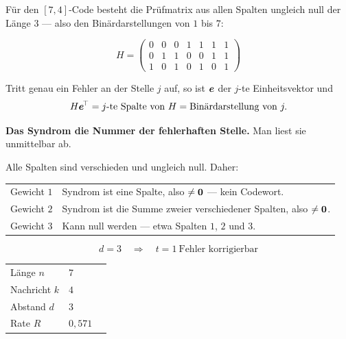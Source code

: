 \begin{merksatz}
Für den $[7,4]$-Code besteht die Prüfmatrix aus allen Spalten ungleich null der Länge $3$ --- also den Binärdarstellungen von $1$ bis $7$:

\[ H = \begin{pmatrix}
0&0&0&1&1&1&1\\
0&1&1&0&0&1&1\\
1&0&1&0&1&0&1
\end{pmatrix} \]

Tritt genau ein Fehler an der Stelle $j$ auf, so ist $\boldsymbol{e}$ der $j$-te Einheitsvektor und
\[ H\boldsymbol{e}^{\!\top} = \text{$j$-te Spalte von } H = \text{Binärdarstellung von } j . \]

\begin{center}
\begin{minipage}{0.9\textwidth}
\textbf{Das Syndrom  die Nummer der fehlerhaften Stelle.} Man liest sie unmittelbar ab.
\end{minipage}
\end{center}

Alle Spalten sind verschieden und ungleich null. Daher:
\begin{center}
{\small
\renewcommand{\arraystretch}{1.5}
\begin{tabular}{@{}P{2.4cm}P{6.2cm}@{}}
\toprule
Gewicht $1$ & Syndrom ist eine Spalte, also $\ne\boldsymbol{0}$ --- kein Codewort.\\
Gewicht $2$ & Syndrom ist die Summe zweier verschiedener Spalten, also $\ne\boldsymbol{0}$.\\
Gewicht $3$ & Kann null werden --- etwa Spalten $1$, $2$ und $3$.\\
\bottomrule
\end{tabular}}
\end{center}

\[ d = 3 \quad\Longrightarrow\quad t = 1 \ \text{Fehler korrigierbar} \]

\begin{center}
\renewcommand{\arraystretch}{1.48}
\begin{tabular}{@{}P{2.4cm}P{2.0cm}P{2.6cm}@{}}
\toprule
Länge $n$ & $7$ & \\
Nachricht $k$ & $4$ & \\
Abstand $d$ & $3$ & \\
Rate $R$ & $0{,}571$ & \\
\bottomrule
\end{tabular}
\end{center}
\end{merksatz}

